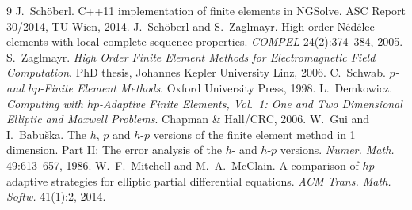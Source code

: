 \documentclass[10pt,a4paper]{article}
\begin{document}
\begin{thebibliography}{9}\small\setlength\itemsep{1pt}
 J.~Sch\"oberl. C++11 implementation of finite elements in NGSolve. ASC Report 30/2014, TU Wien, 2014.
 J.~Sch\"oberl and S.~Zaglmayr. High order N\'ed\'elec elements with local complete sequence properties. \emph{COMPEL} 24(2):374--384, 2005.
 S.~Zaglmayr. \emph{High Order Finite Element Methods for Electromagnetic Field Computation}. PhD thesis, Johannes Kepler University Linz, 2006.
 C.~Schwab. \emph{$p$- and $hp$-Finite Element Methods}. Oxford University Press, 1998.
 L.~Demkowicz. \emph{Computing with $hp$-Adaptive Finite Elements, Vol.~1: One and Two Dimensional Elliptic and Maxwell Problems}. Chapman \& Hall/CRC, 2006.
 W.~Gui and I.~Babu\v{s}ka. The $h$, $p$ and $h$-$p$ versions of the finite element method in 1 dimension. Part II: The error analysis of the $h$- and $h$-$p$ versions. \emph{Numer. Math.} 49:613--657, 1986.
 W.~F.~Mitchell and M.~A.~McClain. A comparison of $hp$-adaptive strategies for elliptic partial differential equations. \emph{ACM Trans. Math. Softw.} 41(1):2, 2014.
\end{thebibliography}
\end{document}
